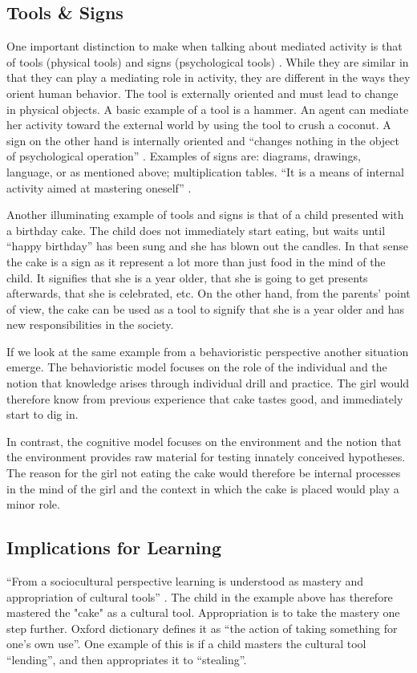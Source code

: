 \subsection{Tools \& Signs}
One important distinction to make when talking about mediated activity is that of tools (physical tools) and signs (psychological tools) \citep{vygotskiui1978mind}. While they are similar in that they can play a mediating role in activity, they are different in the ways they orient human behavior. The tool is externally oriented and must lead to change in physical objects. A basic example of a tool is a hammer. An agent can mediate her activity toward the external world by using the tool to crush a coconut. A sign on the other hand is internally oriented and “changes nothing in the object of psychological operation” \citep{vygotskiui1978mind}. Examples of signs are: diagrams, drawings, language, or as mentioned above; multiplication tables. “It is a means of internal activity aimed at mastering oneself” \citep{vygotskiui1978mind}. 

Another illuminating example of tools and signs is that of a child presented with a birthday cake. The child does not immediately start eating, but waits until “happy birthday” has been sung and she has blown out the candles. In that sense the cake is a sign as it represent a lot more than just food in the mind of the child. It signifies that she is a year older, that she is going to get presents afterwards, that she is celebrated, etc. On the other hand, from the parents’ point of view, the cake can be used as a tool to signify that she is a year older and has new responsibilities in the society. 

If we look at the same example from a behavioristic perspective another situation emerge. The behavioristic model focuses on the role of the individual and the notion that knowledge arises through individual drill and practice. The girl would therefore know from previous experience that cake tastes good, and immediately start to dig in. 

In contrast, the cognitive model focuses on the environment and the notion that the environment provides raw material for testing innately conceived hypotheses. The reason for the girl not eating the cake would therefore be internal processes in the mind of the girl and the context in which the cake is placed would play a minor role. 

\subsection{Implications for Learning}
“From a sociocultural perspective learning is understood as mastery and appropriation of cultural tools” \citetext{Wertsch, 1998, Säljö, 1999, 2001, cited in \citealp{mifsud2010reconsidering}}. The child in the example above has therefore mastered the "cake" as a cultural tool. Appropriation is to take the mastery one step further. Oxford dictionary defines it as “the action of taking something for one’s own use”. One example of this is if a child masters the cultural tool “lending”, and then appropriates it to “stealing”. 

